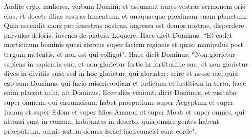 \begin{biblechapter}
\verse Audite ergo, mulieres, verbum Domini; et assumant aures vestrae sermonem oris eius, et docete filias vestras lamentum, et unaquaeque proximam suam planctum. 
\verse Quia ascendit mors per fenestras nostras, ingressa est domos nostras, disperdere parvulos deforis, iuvenes de plateis. 
\verse Loquere. Haec dicit Dominus: “Et cadet morticinum hominis quasi stercus super faciem regionis et quasi manipulus post tergum metentis, et non est qui colligat". 
\verse Haec dicit Dominus: “Non glorietur sapiens in sapientia sua, et non glorietur fortis in fortitudine sua, et non glorietur dives in divitiis suis; 
\verse sed in hoc glorietur, qui gloriatur: scire et nosse me, quia ego sum Dominus, qui facio misericordiam et iudicium et iustitiam in terra; haec enim placent mihi, ait Dominus. 
\verse Ecce dies veniunt, dicit Dominus, et visitabo super omnem, qui circumcisum habet praeputium, 
\verse super Aegyptum et super Iudam et super Edom et super filios Ammon et super Moab et super omnes, qui attonsi sunt in comam, habitantes in deserto, quia omnes gentes habent praeputium, omnis autem domus Israel incircumcisi sunt corde". 
\end{biblechapter}

